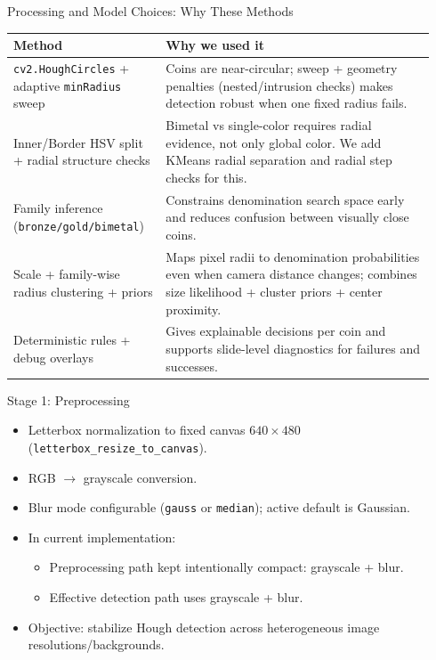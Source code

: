\documentclass[aspectratio=169]{beamer}
\begin{document}
\begin{frame}{Processing and Model Choices: Why These Methods}
  \begin{tabular}{@{}p{0.34\linewidth}p{0.60\linewidth}@{}}
    \toprule
    Method & Why we used it \\
    \midrule
    \texttt{cv2.HoughCircles} + adaptive \texttt{minRadius} sweep & Coins are near-circular; sweep + geometry penalties (nested/intrusion checks) makes detection robust when one fixed radius fails. \\
    Inner/Border HSV split + radial structure checks & Bimetal vs single-color requires radial evidence, not only global color. We add KMeans radial separation and radial step checks for this. \\
    Family inference (\texttt{bronze/gold/bimetal}) & Constrains denomination search space early and reduces confusion between visually close coins. \\
    Scale + family-wise radius clustering + priors & Maps pixel radii to denomination probabilities even when camera distance changes; combines size likelihood + cluster priors + center proximity. \\
    Deterministic rules + debug overlays & Gives explainable decisions per coin and supports slide-level diagnostics for failures and successes. \\
    \bottomrule
  \end{tabular}
\end{frame}

\begin{frame}{Stage 1: Preprocessing}
  \begin{itemize}
    \item Letterbox normalization to fixed canvas \(640 \times 480\) (\texttt{letterbox\_resize\_to\_canvas}).
    \item RGB \(\rightarrow\) grayscale conversion.
    \item Blur mode configurable (\texttt{gauss} or \texttt{median}); active default is Gaussian.
    \item In current implementation:
    \begin{itemize}
      \item Preprocessing path kept intentionally compact: grayscale + blur.
      \item Effective detection path uses grayscale + blur.
    \end{itemize}
    \item Objective: stabilize Hough detection across heterogeneous image resolutions/backgrounds.
  \end{itemize}
\end{frame}
\end{document}
